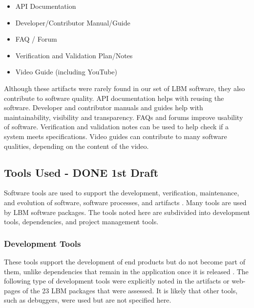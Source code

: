 \documentclass[12pt, notitlepage]{article}
\begin{document}
\begin{singlespace}
	\begin{multicols}{2}	
		\begin{itemize}
			\item API Documentation
			\item Developer/Contributor Manual/Guide
			\item FAQ / Forum
			\item Verification and Validation Plan/Notes
			\item Video Guide (including YouTube)
		\end{itemize}
	\end{multicols}
\end{singlespace}

Although these artifacts were rarely found in our set of LBM software, they also contribute to software quality. API documentation helps with reusing the software. Developer and contributor manuals and guides help with maintainability, visibility and transparency. FAQs and forums improve usability of software. Verification and validation notes can be used to help check if a system meets specifications. Video guides can contribute to many software qualities, depending on the content of the video. 

\subsection{Tools Used - DONE 1st Draft}
Software tools are used to support the development, verification, maintenance, and evolution of software, software processes, and artifacts \citep{ghezzi1991fundamentals}. Many tools are used by LBM software packages. The tools noted here are subdivided into development tools, dependencies, and project management tools.

\subsubsection{Development Tools}

These tools support the development of end products but do not become part of them, unlike dependencies that remain in the application once it is released \citep{ghezzi1991fundamentals}. The following type of development tools were explicitly noted in the artifacts or web-pages of the 23 LBM packages that were assessed. It is likely that other tools, such as debuggers, were used but are not specified here.
\end{document}
